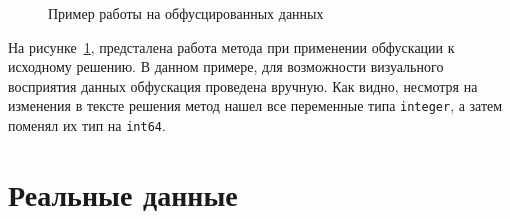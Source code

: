 \begin{figure}[!h]
{  \begin{subfloatrow}[2]
  \end{subfloatrow}
}
{\caption{Пример работы на обфусцированных данных}\label{figO}}
\end{figure}

На рисунке~\ref{figO}, предсталена работа метода при применении обфускации к исходному решению. В данном примере, для
возможности визуального восприятия данных обфускация проведена вручную. Как видно, несмотря на изменения в тексте решения
метод нашел все переменные типа \texttt{integer}, а затем поменял их тип на \texttt{int64}.

\section{Реальные данные}

